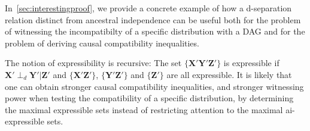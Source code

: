 \documentclass[aps,english,10pt,superscriptaddress,onecolumn,twoside,longbibliography,pra,floatfix,fleqn,nofootinbib]{revtex4-1}%
\theoremstyle{definition}
\newcounter{example}[section]
\newcommand{\aindep}{\ensuremath{\perp_d}} %
\begin{document}
\color{blue}
In~\cref{sec:interestingproof}, we provide a concrete example of how a d-separation relation distinct from ancestral independence can be useful both for the problem of witnessing the incompatibilty of a specific distribution with a DAG and for the problem of deriving causal compatibility inequalities.
\color{black}


The notion of expressibility is recursive: The set $\{\bm{X'}\bm{Y'}\bm{Z'}\}$ is expressible if $\bm{X'}\aindep\bm{Y'}|\bm{Z'}$ and $\{\bm{X'}\bm{Z'}\}$, $\{\bm{Y'}\bm{Z'}\}$ and  $\{\bm{Z'}\}$ are all expressible. 
It is likely that one can obtain stronger causal compatibility inequalities, and stronger witnessing power when testing the compatibility of a specific distribution, by determining the maximal expressible sets instead of restricting attention to the maximal ai-expressible sets. 
\end{document}
